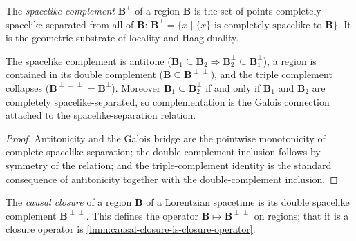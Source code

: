 \begin{definition}
    \label{def:spacelike-complement}
    \leanok
    The \emph{spacelike complement} $\mathbf{B}^\perp$ of a region $\mathbf{B}$ is the set of points completely spacelike-separated from all of $\mathbf{B}$: $\mathbf{B}^\perp = \{ x \mid \{x\} \text{ is completely spacelike to } \mathbf{B} \}$. It is the geometric substrate of locality and Haag duality.
\end{definition}

\begin{lemma}
    \label{lmm:spacelike-complement-order}
    \leanok
    The spacelike complement is antitone ($\mathbf{B}_1 \subseteq \mathbf{B}_2 \Rightarrow \mathbf{B}_2^\perp \subseteq \mathbf{B}_1^\perp$), a region is contained in its double complement ($\mathbf{B} \subseteq \mathbf{B}^{\perp\perp}$), and the triple complement collapses ($\mathbf{B}^{\perp\perp\perp} = \mathbf{B}^\perp$). Moreover $\mathbf{B}_1 \subseteq \mathbf{B}_2^\perp$ if and only if $\mathbf{B}_1$ and $\mathbf{B}_2$ are completely spacelike-separated, so complementation is the Galois connection attached to the spacelike-separation relation.
\end{lemma}
\begin{proof}
    \leanok
    Antitonicity and the Galois bridge are the pointwise monotonicity of complete spacelike separation; the double-complement inclusion follows by symmetry of the relation; and the triple-complement identity is the standard consequence of antitonicity together with the double-complement inclusion.
\end{proof}

\begin{definition}
    \label{def:causal-closure}
    \leanok
    The \emph{causal closure} of a region $\mathbf{B}$ of a Lorentzian spacetime is its double spacelike complement $\mathbf{B}^{\perp\perp}$. This defines the operator $\mathbf{B} \mapsto \mathbf{B}^{\perp\perp}$ on regions; that it is a closure operator is \ref{lmm:causal-closure-is-closure-operator}.
\end{definition}


